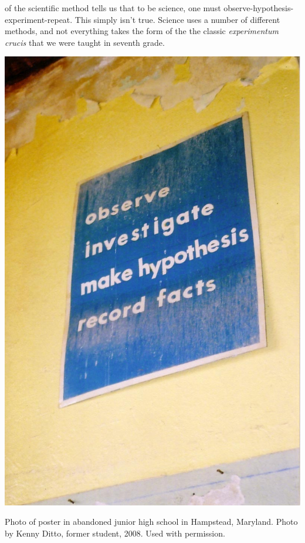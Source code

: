 \begin{refsection}
 of the scientific method tells us that to be science, one must observe-hypothesis-experiment-repeat. This simply isn't true. Science uses a number of different methods, and not everything takes the form of the the classic \emph{experimentum crucis} that we were taught in seventh grade.
\begin{marginfigure}
 \begin{center}
     \includegraphics[scale=0.75]{../images/observe_poster.jpg}
\end{center}
 \caption{Photo of poster in abandoned junior high school in Hampstead, Maryland. Photo by Kenny Ditto, former student, 2008. Used with permission.}
\label{fig: scientificmethod}
\end{marginfigure}



\end{refsection}
